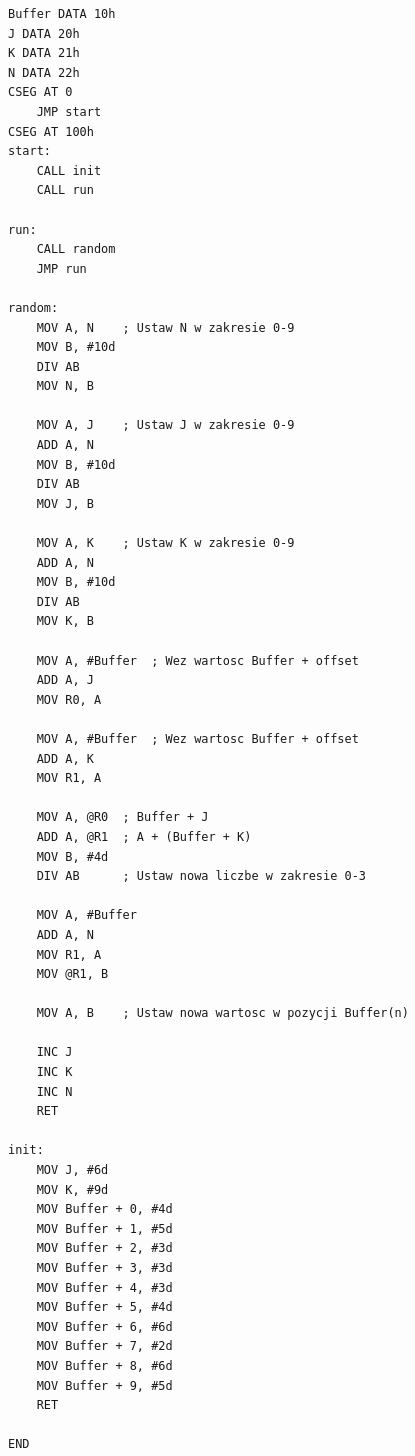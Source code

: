 \documentclass{article}
\begin{document}
\begin{lstlisting}
Buffer DATA 10h
J DATA 20h
K DATA 21h
N DATA 22h
CSEG AT 0
	JMP start
CSEG AT 100h
start:
	CALL init
	CALL run

run:
	CALL random
	JMP run

random:	
	MOV A, N	; Ustaw N w zakresie 0-9
	MOV B, #10d
	DIV AB
	MOV N, B

	MOV A, J	; Ustaw J w zakresie 0-9
	ADD A, N
	MOV B, #10d
	DIV AB
	MOV J, B
	
	MOV A, K	; Ustaw K w zakresie 0-9
	ADD A, N
	MOV B, #10d
	DIV AB
	MOV K, B
	
	MOV A, #Buffer	; Wez wartosc Buffer + offset
	ADD A, J
	MOV R0, A
	
	MOV A, #Buffer	; Wez wartosc Buffer + offset
	ADD A, K
	MOV R1, A

	MOV A, @R0	; Buffer + J
	ADD A, @R1	; A + (Buffer + K)
	MOV B, #4d
	DIV AB		; Ustaw nowa liczbe w zakresie 0-3
	
	MOV A, #Buffer
	ADD A, N
	MOV R1, A
	MOV @R1, B
	
	MOV A, B	; Ustaw nowa wartosc w pozycji Buffer(n)
	
	INC J
	INC K
	INC N
	RET
 
init:
	MOV J, #6d
	MOV K, #9d
	MOV Buffer + 0, #4d
	MOV Buffer + 1, #5d
	MOV Buffer + 2, #3d
	MOV Buffer + 3, #3d
	MOV Buffer + 4, #3d
	MOV Buffer + 5, #4d
	MOV Buffer + 6, #6d
	MOV Buffer + 7, #2d
	MOV Buffer + 8, #6d
	MOV Buffer + 9, #5d
	RET
	
END
\end{lstlisting}
\end{document}

